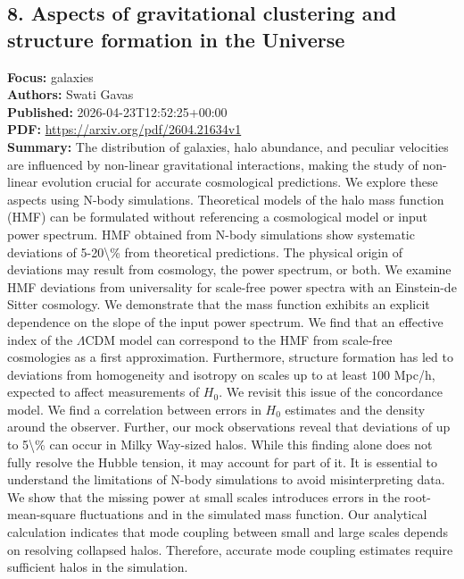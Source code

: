 \documentclass[11pt]{article}
\begin{document}
\subsection*{8. Aspects of gravitational clustering and structure formation in the Universe}
\textbf{Focus:} galaxies\\
\textbf{Authors:} Swati Gavas\\
\textbf{Published:} 2026-04-23T12:52:25+00:00\\
\textbf{PDF:} \href{https://arxiv.org/pdf/2604.21634v1}{https://arxiv.org/pdf/2604.21634v1}\\
\textbf{Summary:}
The distribution of galaxies, halo abundance, and peculiar velocities are influenced by non-linear gravitational interactions, making the study of non-linear evolution crucial for accurate cosmological predictions. We explore these aspects using N-body simulations. Theoretical models of the halo mass function (HMF) can be formulated without referencing a cosmological model or input power spectrum. HMF obtained from N-body simulations show systematic deviations of 5-20\textbackslash{}\% from theoretical predictions. The physical origin of deviations may result from cosmology, the power spectrum, or both. We examine HMF deviations from universality for scale-free power spectra with an Einstein-de Sitter cosmology. We demonstrate that the mass function exhibits an explicit dependence on the slope of the input power spectrum. We find that an effective index of the $Λ$CDM model can correspond to the HMF from scale-free cosmologies as a first approximation. Furthermore, structure formation has led to deviations from homogeneity and isotropy on scales up to at least $100$ Mpc/h, expected to affect measurements of $H_0$. We revisit this issue of the concordance model. We find a correlation between errors in $H_0$ estimates and the density around the observer. Further, our mock observations reveal that deviations of up to 5\textbackslash{}\% can occur in Milky Way-sized halos. While this finding alone does not fully resolve the Hubble tension, it may account for part of it. It is essential to understand the limitations of N-body simulations to avoid misinterpreting data. We show that the missing power at small scales introduces errors in the root-mean-square fluctuations and in the simulated mass function. Our analytical calculation indicates that mode coupling between small and large scales depends on resolving collapsed halos. Therefore, accurate mode coupling estimates require sufficient halos in the simulation.
\newpage
\end{document}
